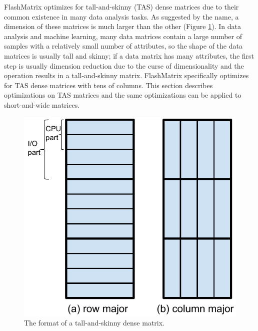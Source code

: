 FlashMatrix optimizes for tall-and-skinny (TAS) dense matrices due to their
common existence in many data analysis tasks. As suggested by the name,
a dimension of these matrices is much larger than the other (Figure \ref{fig:tas_mat}).
In data analysis and machine learning, many data matrices contain a large
number of samples with a relatively small number of attributes, so the shape
of the data matrices is usually tall and skinny; if a data matrix has many
attributes, the first step is usually dimension reduction due to the curse of
dimensionality \cite{} and the operation results in a tall-and-skinny matrix.
FlashMatrix specifically optimizes for TAS dense matrices with tens of columns.
This section describes optimizations on TAS matrices and the same optimizations
can be applied to short-and-wide matrices.

\begin{figure}
	\centering
	\includegraphics[scale=0.5]{./dense_matrix.pdf}
	\caption{The format of a tall-and-skinny dense matrix.}
	\label{fig:tas_mat}
\end{figure}

